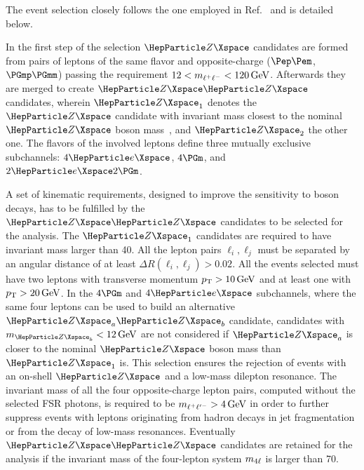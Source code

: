 
The event selection closely follows the one employed in Ref.~\cite{CMSHIG19001} and is detailed below.
 
In the first step of the selection $\PZ$ candidates are formed from pairs of leptons of the same flavor and opposite-charge ($\Pep\Pem$, $\PGmp\PGmm$) passing the requirement $12 < m_{\ell^{+}\ell^{-}}  < 120\,\text{Ge\hspace{-.08em}V}$. 
Afterwards they are merged to create $\PZ\PZ$ candidates, wherein $\PZ_1$ denotes the $\PZ$ candidate with invariant mass closest to the nominal $\PZ$ boson mass~\cite{Zyla:2020zbs}, and $\PZ_2$ the other one.
The flavors of the involved leptons define three mutually exclusive subchannels: $4\Pe$, $4\Pgm$, and $2\Pe 2\Pgm$.

A set of kinematic requirements, designed to improve the sensitivity to \PH boson decays, has to be fulfilled by the $\PZ\PZ$ candidates to be selected for the analysis.
The $\PZ_1$ candidates are required to have invariant mass larger than 40\GeV.
All the lepton pairs $\ell_i, \ell_j$ must be separated by an angular distance of at least $\Delta R(\ell_i, \ell_j) > 0.02$.
All the events selected must have two leptons with transverse momentum $p_{\mathrm{T}} > 10\,\text{Ge\hspace{-.08em}V}$ and at least one with $p_{\mathrm{T}} > 20\,\text{Ge\hspace{-.08em}V}$.	
In the $4\Pgm$ and $4\Pe$ subchannels, where the same four leptons can be used to build an alternative $\PZ_a \PZ_b$ candidate, candidates with $m_{\PZ_b}<12\GeV$ are not considered if $\PZ_a$ is closer to the nominal $\PZ$ boson mass than $\PZ_1$ is. This selection ensures the rejection of events with an on-shell $\PZ$ and a low-mass dilepton resonance.
The invariant mass of all the four opposite-charge lepton pairs, computed without the selected FSR photons, is required to be $m_{\ell^{+}\ell'^{-}} > 4\,\text{Ge\hspace{-.08em}V}$ in order to further suppress events with leptons originating from hadron decays in jet fragmentation or from the decay of low-mass resonances.
Eventually $\PZ\PZ$ candidates are retained for the analysis if the invariant mass of the four-lepton system $m_{4\ell}$ is larger than 70\GeV.

